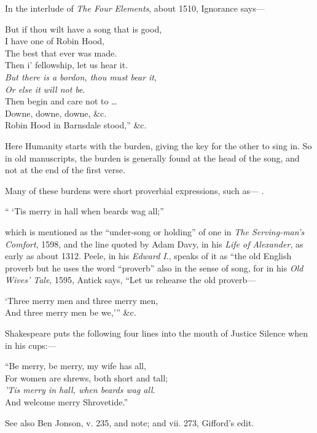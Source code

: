 In the interlude of \textit{The Four Elements}, about 1510, Ignorance says—
\begin{scverse}
But if thou wilt have a song that is good,\\
I have one of Robin Hood,\\
The best that ever was made.\\
Then i’ fellowship, let us hear it.\\
\textit{But there is a bordon, thou must bear it},\\
\textit{Or else it will not be}.\\
Then begin and care not to \dots\\
Downe, downe, downe, \&c.\\
Robin Hood in Barnsdale stood,” \&c.
\end{scverse}


Here Humanity starts with the burden, giving the key for the other to sing in.
So in old manuscripts, the burden is generally found at the head of the song, and
not at the end of the first verse.

Many of these burdens were short proverbial expressions, such as— .
\begin{scverse}
“ ‘Tis merry in hall when beards wag all;”
\end{scverse}
which is mentioned as the “under-song or holding” of one in \textit{The Serving-man's
Comfort}, 1598, and the line quoted by Adam Davy, in his \textit{Life of Alexander}, as
early as about 1312. Peele, in his \pagebreak \textit{Edward I}., speaks of it as “the old
English proverb but he uses the word “proverb” also in the sense of song, for
in his \textit{Old Wives’ Tale}, 1595, Antick says, “Let us rehearse the old proverb—
\settowidth{\versewidth}{‘Three merry men and three merry men,}
\begin{scverse}
‘Three merry men and three merry men,\\
And three merry men be we,’” \&c.
\end{scverse}
Shakespeare puts the following four lines into the mouth of Justice Silence when
in his cups:—
\begin{scverse}
“Be merry, be merry, my wife has all,\\
For women are shrews, both short and tall;\\
\textit{’Tis merry in hall, when beards wag all}.\\
\vin And welcome merry Shrovetide.”
\end{scverse}
See also Ben Jonson, v. 235, and note; and vii. 273, Gifford’s edit.

